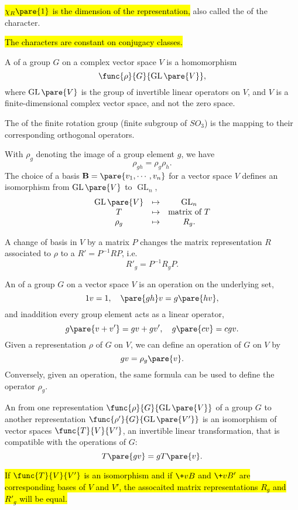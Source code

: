 \documentclass[hidelinks]{article}
\DeclareMathOperator{\GL}{GL}
\let\oldgloss\gloss
\def\gloss#1{\textnormal{\textbf{\oldgloss{#1}}}}
\begin{document}
\hl{$\chi_R\pare{1}$ is the dimension of the representation,} also called the  of the character.
\par
\hl{The characters are constant on conjugacy classes.}
\begin{definition}
    A  of a group $G$ on a complex vector space $V$ is a homomorphism
    \[ \func{\rho}{G}{\GL\pare{V}}, \]
    where $\GL\pare{V}$ is the group of invertible linear operators on $V$, and $V$ is a finite-dimensional complex vector space, and not the zero space.
\end{definition}
The  of the finite rotation group (finite subgroup of $SO_3$) is the mapping to their corresponding orthogonal operators.
\par
With $\rho_g$ denoting the image of a group element $g$, we have
\[ \rho_{gh} = \rho_g \rho_h. \]
The choice of a basis $\mathbf{B} = \pare{v_1,\cdots,v_n}$ for a vector space $V$ defines an isomorphism from $\GL\pare{V}$ to $\GL_n$,
\[ \begin{array}{ccc}
    \GL\pare{V} & \mapsto & \GL_n \\
    T & \mapsto & \text{matrix of } T \\
    \rho_g & \mapsto & R_g.
\end{array} \]
\par
A change of basis in $V$ by a matrix $P$ changes the matrix representation $R$ associated to $\rho$ to a  $R' = P^{-1}RP$, i.e.
\[ R'_g = P^{-1}R_g P. \]
\par
An  of a group $G$  on a vector space $V$ is an operation on the underlying set,
\[ 1v = 1,\quad \pare{gh}v = g\pare{hv}, \]
and inaddition every group element acts as a linear operator,
\[ g\pare{v+v'} = gv + gv',\quad g\pare{cv} = cgv. \]
Given a representation $\rho$ of $G$ on $V$, we can define an operation of $G$ on $V$ by
\[ gv = \rho_g\pare{v}. \]
Conversely, given an operation, the same formula can be used to define the operator $\rho_g$.
\par
\begin{definition}
    An  from one representation $\func{\rho}{G}{\GL\pare{V}}$ of a group $G$ to another representation $\func{\rho'}{G}{\GL\pare{V'}}$ is an isomorphism of vector spaces $\func{T}{V}{V'}$, an invertible linear transformation, that is compatible with the operations of $G$:
    \[ T\pare{gv} = gT\pare{v}. \]
\end{definition}
\hl{If $\func{T}{V}{V'}$ is an isomorphism and if $\+vB$ and $\+vB'$ are corresponding bases of $V$ and $V'$, the assocaited matrix representations $R_g$ and $R'_g$ will be equal.}
\end{document}
